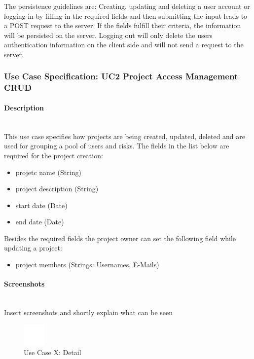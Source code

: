 \noindent
The persistence guidelines are: 
\newline
\noindent
Creating, updating and deleting a user account or logging in by filling in the required fields and then submitting the input leads to a POST request to the server. If the fields fulfill their criteria, the information will be persisted on the server. Logging out will only delete the users authentication information on the client side and will not send a request to the server.


\newpage
\subsubsection{Use Case Specification: \ac{UC}2 Project Access Management CRUD}
\label{sec:domainBbc}

\paragraph*{Description}\mbox{}\\
This use case specifies how projects are being created, updated, deleted and are used for grouping a pool of users and risks.
The fields in the list below are required for the project creation:

\begin{itemize}
	\vspace{-3mm}
	\setlength\itemsep{-1em}
	\item projetc name (String)
	\item project description (String)
	\item start date (Date)
	\item end date (Date)
\end{itemize}
Besides the required fields the project owner can set the following field while updating a project:
\begin{itemize}
	\vspace{-3mm}
	\setlength\itemsep{-1em}
	\item project members (Strings: Usernames, E-Mails)
\end{itemize}

\paragraph*{Screenshots}\mbox{}\\
Insert screenshots and shortly explain what can be seen
\begin{figure}[h] 
	\centering
	\includegraphics[width=0.1\textwidth]{Content/Domain/placeholder.png}
	\caption{Use Case X: Detail}
	\label{fig:useCaseXDetailY}
\end{figure}

